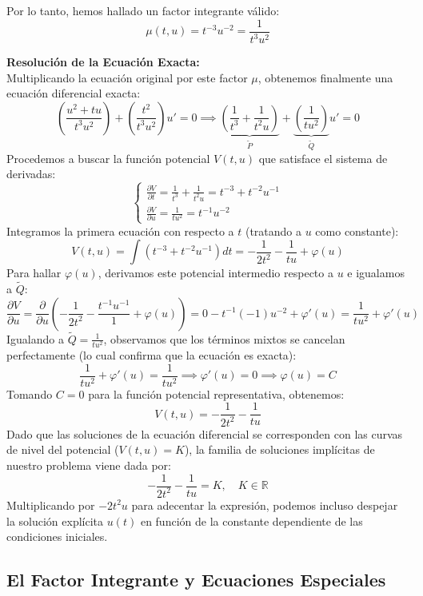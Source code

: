 {    Por lo tanto, hemos hallado un factor integrante válido:
    \[
        \mu(t,u) = t^{-3} u^{-2} = \frac{1}{t^3 u^2}
    \]
    
    \textbf{Resolución de la Ecuación Exacta:} \\
    Multiplicando la ecuación original por este factor $\mu$, obtenemos finalmente una ecuación diferencial exacta:
    \[
        \left( \frac{u^2 + tu}{t^3 u^2} \right) + \left( \frac{t^2}{t^3 u^2} \right) u' = 0 \implies \underbrace{\left( \frac{1}{t^3} + \frac{1}{t^2 u} \right)}_{\tilde{P}} + \underbrace{\left( \frac{1}{t u^2} \right)}_{\tilde{Q}} u' = 0
    \]
    Procedemos a buscar la función potencial $V(t,u)$ que satisface el sistema de derivadas:
    \[
        \begin{cases}
            \frac{\partial V}{\partial t} = \frac{1}{t^3} + \frac{1}{t^2 u} = t^{-3} + t^{-2} u^{-1} \\
            \frac{\partial V}{\partial u} = \frac{1}{t u^2} = t^{-1} u^{-2}
        \end{cases}
    \]
    Integramos la primera ecuación con respecto a $t$ (tratando a $u$ como constante):
    \[
        V(t,u) = \int \left( t^{-3} + t^{-2} u^{-1} \right) dt = -\frac{1}{2t^2} - \frac{1}{tu} + \varphi(u)
    \]
    Para hallar $\varphi(u)$, derivamos este potencial intermedio respecto a $u$ e igualamos a $\tilde{Q}$:
    \[
        \frac{\partial V}{\partial u} = \frac{\partial}{\partial u} \left( -\frac{1}{2t^2} - \frac{t^{-1} u^{-1}}{1} + \varphi(u) \right) = 0 - t^{-1}(-1)u^{-2} + \varphi'(u) = \frac{1}{tu^2} + \varphi'(u)
    \]
    Igualando a $\tilde{Q} = \frac{1}{tu^2}$, observamos que los términos mixtos se cancelan perfectamente (lo cual confirma que la ecuación es exacta):
    \[
        \frac{1}{tu^2} + \varphi'(u) = \frac{1}{tu^2} \implies \varphi'(u) = 0 \implies \varphi(u) = C
    \]
    Tomando $C=0$ para la función potencial representativa, obtenemos:
    \[
        V(t,u) = -\frac{1}{2t^2} - \frac{1}{tu}
    \]
    Dado que las soluciones de la ecuación diferencial se corresponden con las curvas de nivel del potencial ($V(t,u) = K$), la familia de soluciones implícitas de nuestro problema viene dada por:
    \[
        -\frac{1}{2t^2} - \frac{1}{tu} = K, \quad K \in \mathbb{R}
    \]
    Multiplicando por $-2t^2 u$ para adecentar la expresión, podemos incluso despejar la solución explícita $u(t)$ en función de la constante dependiente de las condiciones iniciales.
}

\subsection{El Factor Integrante y Ecuaciones Especiales}

